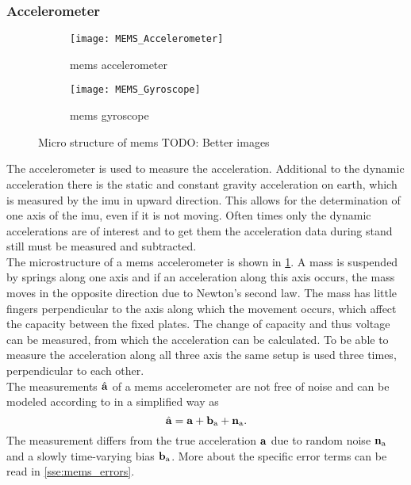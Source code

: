 \subsubsection{ Accelerometer}
\begin{figure}[htb]
    \centering
    \begin{subfigure}{0.48\textwidth}
        \centering
        \texttt{[image: MEMS\_Accelerometer]}
        \caption{\acrshort{mems} accelerometer}
        \label{fig:MEMS_Accelerometer}
    \end{subfigure}
    \begin{subfigure}{0.48\textwidth}
        \centering
        \texttt{[image: MEMS\_Gyroscope]}
        \caption{\acrshort{mems} gyroscope}
        \label{fig:MEMS_Gyroscope}
    \end{subfigure}
    \caption{Micro structure of \acrshort{mems} TODO: Better images}
    \label{fig:MEMS_design}
\end{figure}
The accelerometer is used to measure the acceleration.
Additional to the dynamic acceleration there is the static and constant gravity acceleration on earth, which is measured by the \gls{imu} in upward direction.
This allows for the determination of one axis of the \gls{imu}, even if it is not moving.
Often times only the dynamic accelerations are of interest and to get them the acceleration data during stand still must be measured and subtracted.\\
The microstructure of a \gls{mems} accelerometer is shown in \cref{fig:MEMS_Accelerometer}.
A mass is suspended by springs along one axis and if an acceleration along this axis occurs, the mass moves in the opposite direction due to Newton's second law.
The mass has little fingers perpendicular to the axis along which the movement occurs, which affect the capacity between the fixed plates.
The change of capacity and thus voltage can be measured, from which the acceleration can be calculated.
To be able to measure the acceleration along all three axis the same setup is used three times, perpendicular to each other.\\
The measurements $\hat{\vb{a}}$ of a \gls{mems} accelerometer are not free of noise and can be modeled according to \cite{Lefferts1982} in a simplified way as
\begin{equation}
    \hat{\vb{a}} = \vb{a} + \vb{b}_\mathrm{a} + \vb{n}_\mathrm{a}.
\end{equation}
The measurement differs from the true acceleration $\vb{a}$ due to random noise $\vb{n}_\mathrm{a}$ and a slowly time-varying bias $\vb{b}_\mathrm{a}$.
More about the specific error terms can be read in \cref{sse:mems_errors}.

